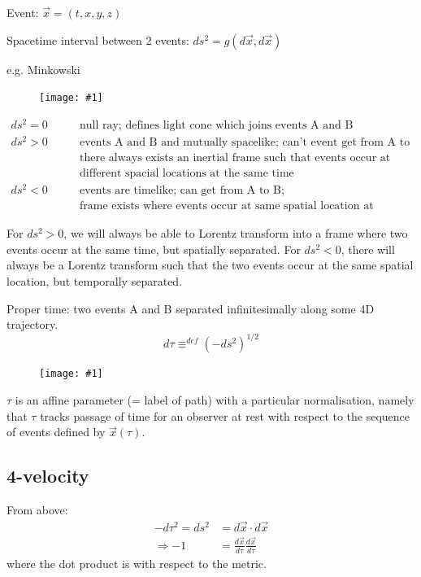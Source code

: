 \documentclass[a4paper]{article} %
\renewcommand{\picture}[1]
{
\begin{figure}[h]
\centering
\texttt{[image: \#1]}
\end{figure}
}
\begin{document}
Event: $\vec{x}=(t,x,y,z)$

Spacetime interval between 2 events: $ds^2=g(d\vec{x},d\vec{x})$

e.g. Minkowski

\picture{images/lightcone.png}

\begin{align}
ds^2=0\qquad &\text{null ray; defines light cone which joins events A and B}\\
ds^2>0\qquad &\text{events A and B and mutually spacelike; can't event get from A to B;}\\
\qquad&\text{there always exists an inertial frame such that events occur at}\nonumber\\
\qquad&\text{different spacial locations at the same time}\nonumber\\
ds^2<0 \qquad& \text{events are timelike; can get from A to B;}\\
\qquad &\text{frame exists where events occur at same spatial location at different times}\nonumber
\end{align}

For $ds^2>0$, we will always be able to Lorentz transform into a frame where two events occur at the same time, but spatially separated. For $ds^2<0$, there will always be a Lorentz transform such that the two events occur at the same spatial location, but temporally separated.

Proper time: two events A and B separated infinitesimally along some 4D trajectory.
\begin{equation}
d\tau \equiv^{def}(-ds^2)^{1/2}
\end{equation}

\picture{images/propertime_path}


$\tau$ is an affine parameter (= label of path) with a particular normalisation, namely that $\tau$ tracks passage of time for an observer at rest with respect to the sequence of events defined by $\vec{x}(\tau)$.

\subsection{4-velocity}

From above:
\begin{align*}
-d\tau^2=ds^2&=d\vec{x}\cdot d\vec{x}\\
\Rightarrow -1&=\frac{d\vec{x}}{d\tau}\frac{d\vec{x}}{d\tau}
\end{align*}
where the dot product is with respect to the metric. 
\end{document}
